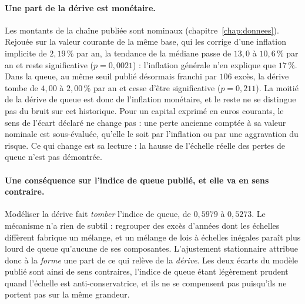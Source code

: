 \paragraph{Une part de la dérive est monétaire.} Les montants de la chaîne publiée sont
nominaux (chapitre~\ref{chap:donnees}). Rejouée sur la valeur courante de la même base, qui les
corrige d'une inflation implicite de $2{,}19\,\%$ par an, la tendance de la médiane passe de
$13{,}0$ à $10{,}6\,\%$ par an et reste significative ($p=0{,}0021$) : l'inflation générale n'en
explique que $17\,\%$. Dans la queue, au même seuil publié désormais franchi par $106$ excès, la
dérive tombe de $4{,}00$ à $2{,}00\,\%$ par an et cesse d'être significative ($p=0{,}211$). La
moitié de la dérive de queue est donc de l'inflation monétaire, et le reste ne se distingue pas
du bruit sur cet historique. Pour un capital exprimé en euros courants, le sens de l'écart
déclaré ne change pas : une perte ancienne comptée à sa valeur nominale est sous-évaluée,
qu'elle le soit par l'inflation ou par une aggravation du risque. Ce qui change est sa lecture :
la hausse de l'échelle réelle des pertes de queue n'est pas démontrée.

\paragraph{Une conséquence sur l'indice de queue publié, et elle va en sens contraire.}
Modéliser la dérive fait \emph{tomber} l'indice de queue, de $0{,}5979$ à $0{,}5273$. Le
mécanisme n'a rien de subtil : regrouper des excès d'années dont les échelles diffèrent fabrique
un mélange, et un mélange de lois à échelles inégales paraît plus lourd de queue qu'aucune de ses
composantes. L'ajustement stationnaire attribue donc à la \emph{forme} une part de ce qui relève
de la \emph{dérive}. Les deux écarts du modèle publié sont ainsi de sens contraires, l'indice de
queue étant légèrement prudent quand l'échelle est anti-conservatrice, et ils ne se compensent
pas puisqu'ils ne portent pas sur la même grandeur.

